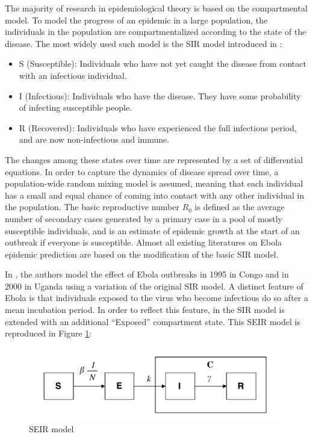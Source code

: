 \documentclass[10pt, journal,onecolumn]{IEEEtran}
\begin{document}
The majority of research in epidemiological theory is based on the compartmental model. To model the
progress of an epidemic in a large population, the individuals in the population are
compartmentalized according to the state of the disease. The most widely used such model is the SIR
model introduced in \citep{very_old_paper}:

\begin{itemize}
\item {S (Susceptible):} Individuals who have not yet caught the disease from contact with an infectious
  individual.
\item {I (Infectious):} Individuals who have the disease. They have some probability of
  infecting susceptible people.
\item {R (Recovered):} Individuals who have experienced the full infectious period, and are
  now non-infectious and immune.
\end{itemize}

The changes among these states over time are represented by a set of differential equations. In
order to capture the dynamics of disease spread over time, a population-wide random mixing model is
assumed, meaning that each individual has a small and equal chance of coming into contact with any
other individual in the population. The basic reproductive number $R_0$ is defined as the average
number of secondary cases generated by a primary case in a pool of mostly susceptible individuals,
and is an estimate of epidemic growth at the start of an outbreak if everyone is susceptible. Almost
all existing literatures \citep{chowell2004basic,legrand2007understanding,gomes2014assessing} on
Ebola epidemic prediction are based on the modification of the basic SIR model.

In \citep{chowell2004basic}, the authors model the effect of Ebola outbreaks in 1995 in Congo and in
2000 in Uganda using a variation of the original SIR model. A distinct feature of Ebola is that
individuals exposed to the virus who become infectious do so after a mean incubation period. In
order to reflect this feature, in the SIR model is extended with an additional ``Exposed''
compartment state. This SEIR model is reproduced in Figure \ref{fig:SEIR_model}:

\begin{figure}[h!]
\captionsetup{justification=centering}
\includegraphics[scale=0.4]{seir_model_fig}
\centering\caption{SEIR model}
\label{fig:SEIR_model}
\end{figure}
\end{document}
